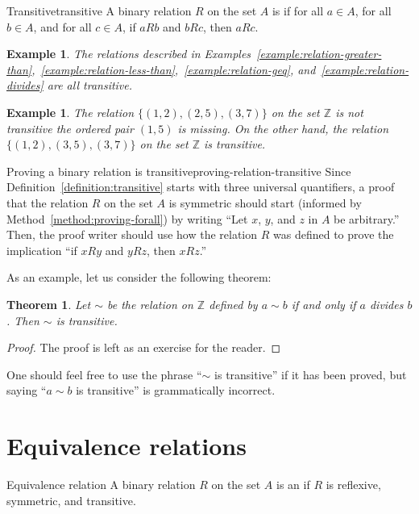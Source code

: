 \documentclass{book}
\newcounter{ekcounter}%
\theoremstyle{ekimcustom}
\newtheorem{theorem}[ekcounter]{Theorem}
\newtheorem{example}[ekcounter]{Example}
\newcommand\defn[1]{{\color{blue}{\bf #1}}}
\begin{document}
\begin{bdefinition}{Transitive}{transitive}
A binary relation $R$ on the set $A$ is \defn{transitive} if for all $a \in A$, for all $b \in A$, and for all $c \in A$, if $aRb$ and $bRc$, then $aRc$.
\end{bdefinition}
\begin{example}
The relations described in Examples~\ref{example:relation-greater-than},~\ref{example:relation-less-than},~\ref{example:relation-geq}, and~\ref{example:relation-divides} are all transitive.
\end{example}
\begin{example}
The relation $\{(1,2), (2,5), (3,7)\}$ on the set $\mathbb{Z}$ is not transitive the ordered pair $(1,5)$ is missing. On the other hand, the relation $\{(1,2), (3,5), (3,7)\}$ on the set $\mathbb{Z}$ is transitive.
\end{example}

\begin{bmethod}{Proving a binary relation is transitive}{proving-relation-transitive}
Since Definition~\ref{definition:transitive} starts with three universal quantifiers, a proof that the relation $R$ on the set $A$ is symmetric should start (informed by Method~\ref{method:proving-forall}) by writing ``Let $x$, $y$, and $z$ in $A$ be arbitrary.'' Then, the proof writer should use how the relation $R$ was defined to prove the implication ``if $xRy$ and $yRz$, then $xRz$.''
\end{bmethod}
As an example, let us consider the following theorem:
\begin{theorem}
Let $\sim$ be the relation on $\mathbb{Z}$ defined by $a \sim b$ if and only if $a$ divides $b$. Then $\sim$ is transitive.
\end{theorem}
\begin{proof}
The proof is left as an exercise for the reader.
\end{proof}
\begin{bwarning}{}{}
One should feel free to use the phrase ``$\sim$ is transitive'' if it has been proved, but saying ``$a \sim b$ is transitive'' is grammatically incorrect.
\end{bwarning}

\section{Equivalence relations}

\begin{bdefinition}{Equivalence relation}{}
A binary relation $R$ on the set $A$ is an \defn{equivalence relation} if $R$ is reflexive, symmetric, and transitive.
\end{bdefinition}
\end{document}
